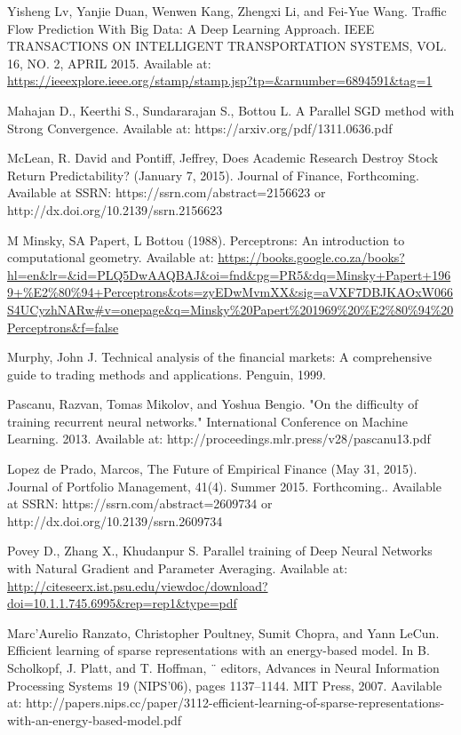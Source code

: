 \documentclass[a4paper,latin]{paper}
\begin{document}
\begin{thebibliography}{9}
Yisheng Lv, Yanjie Duan, Wenwen Kang, Zhengxi Li, and Fei-Yue Wang. Traffic Flow Prediction With Big Data:
A Deep Learning Approach. IEEE TRANSACTIONS ON INTELLIGENT TRANSPORTATION SYSTEMS, VOL. 16, NO. 2, APRIL 
2015. Available at: \url{https://ieeexplore.ieee.org/stamp/stamp.jsp?tp=&arnumber=6894591&tag=1}

Mahajan D., Keerthi S., Sundararajan S., Bottou L. A Parallel SGD method with Strong 
Convergence. Available at: https://arxiv.org/pdf/1311.0636.pdf

McLean, R. David and Pontiff, Jeffrey, Does Academic Research Destroy Stock Return Predictability? (January 7, 2015). Journal of Finance, Forthcoming. Available at SSRN: https://ssrn.com/abstract=2156623 or http://dx.doi.org/10.2139/ssrn.2156623

M Minsky, SA Papert, L Bottou (1988). Perceptrons: An introduction to computational  geometry. Available at: \url{https://books.google.co.za/books?hl=en&lr=&id=PLQ5DwAAQBAJ&oi=fnd&pg=PR5&dq=Minsky+Papert+1969+%E2%80%94+Perceptrons&ots=zyEDwMvmXX&sig=aVXF7DBJKAOxW066S4UCyzhNARw#v=onepage&q=Minsky%20Papert%201969%20%E2%80%94%20Perceptrons&f=false}

Murphy, John J. Technical analysis of the financial markets: A comprehensive guide to trading methods and applications. Penguin, 1999.

Pascanu, Razvan, Tomas Mikolov, and Yoshua Bengio. "On the difficulty of training recurrent neural networks." International Conference on Machine Learning. 2013.
Available at: http://proceedings.mlr.press/v28/pascanu13.pdf

Lopez de Prado, Marcos, The Future of Empirical Finance (May 31, 2015). Journal of Portfolio Management, 41(4). Summer 2015. Forthcoming.. Available at SSRN: https://ssrn.com/abstract=2609734 or http://dx.doi.org/10.2139/ssrn.2609734

Povey D., Zhang X., Khudanpur S. Parallel training of Deep Neural Networks with Natural Gradient and Parameter Averaging. Available at: \url{http://citeseerx.ist.psu.edu/viewdoc/download?doi=10.1.1.745.6995&rep=rep1&type=pdf}

Marc’Aurelio Ranzato, Christopher Poultney, Sumit Chopra, and Yann LeCun. Efficient learning of sparse representations with an energy-based model. In B. Scholkopf, J. Platt, and T. Hoffman, ¨ editors, Advances in Neural Information Processing Systems 19 (NIPS’06), pages 1137–1144. MIT Press, 
2007. Aavilable at: http://papers.nips.cc/paper/3112-efficient-learning-of-sparse-representations-with-an-energy-based-model.pdf


\end{thebibliography}
\end{document}
